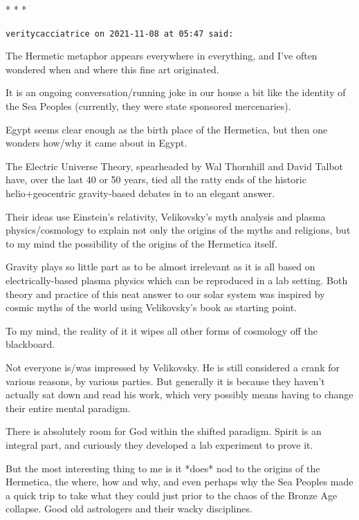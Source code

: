 
\begin{center}* * *\end{center}

\begin{footnotesize}
\begin{sffamily}
\texttt{veritycacciatrice on 2021-11-08 at 05:47 said:}

The Hermetic metaphor appears everywhere in everything, and I've often wondered when and where this fine art originated.

It is an ongoing conversation/running joke in our house a bit like the identity of the Sea Peoples (currently, they were state sponsored mercenaries).

Egypt seems clear enough as the birth place of the Hermetica, but then one wonders how/why it came about in Egypt.

The Electric Universe Theory, spearheaded by Wal Thornhill and David Talbot have, over the last 40 or 50 years, tied all the ratty ends of the historic helio+geocentric gravity-based debates in to an elegant answer.

Their ideas use Einstein's relativity, Velikovsky's myth analysis and plasma physics/cosmology to explain not only the origins of the myths and religions, but to my mind the possibility of the origins of the Hermetica itself.

Gravity plays so little part as to be almost irrelevant as it is all based on electrically-based plasma physics which can be reproduced in a lab setting. Both theory and practice of this neat answer to our solar system was inspired by cosmic myths of the world using Velikovsky's book as starting point.

To my mind, the reality of it it wipes all other forms of cosmology off the blackboard.

Not everyone is/was impressed by Velikovsky. He is still considered a crank for various reasons, by various parties. But generally it is because they haven't actually sat down and read his work, which very possibly means having to change their entire mental paradigm.

There is absolutely room for God within the shifted paradigm. Spirit is an integral part, and curiously they developed a lab experiment to prove it.

But the most interesting thing to me is it *does* nod to the origins of the Hermetica, the where, how and why, and even perhaps why the Sea Peoples made a quick trip to take what they could just prior to the chaos of the Bronze Age collapse. Good old astrologers and their wacky disciplines.


\end{sffamily}
\end{footnotesize}
